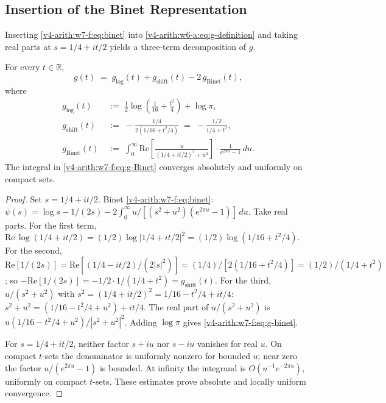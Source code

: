 \subsection{Insertion of the Binet Representation}
\label{v4-arith:w7-f:binet-decomposition:insertion}

Inserting \eqref{v4-arith:w7-f:eq:binet} into
\eqref{v4-arith:w6-a:eq:g-definition} and taking real parts at
\(s=1/4+it/2\) yields a three-term decomposition of \(g\).

\begin{lemma}
\label{v4-arith:w7-f:lem:g-binet}
For every \(t\in\mathbb{R}\),
\begin{equation}
\label{v4-arith:w7-f:eq:g-binet}
g(t)\;=\;g_{\mathrm{log}}(t)+g_{\mathrm{shift}}(t)-2\,g_{\mathrm{Binet}}(t),
\end{equation}
where
\begin{align}
\label{v4-arith:w7-f:eq:g-log}
g_{\mathrm{log}}(t)&\;:=\;\tfrac{1}{2}\log\!\left(\tfrac{1}{16}+\tfrac{t^{2}}{4}\right)+\log\pi,\\
\label{v4-arith:w7-f:eq:g-shift}
g_{\mathrm{shift}}(t)&\;:=\;-\frac{1/4}{2(1/16+t^{2}/4)}\;=\;-\frac{1/2}{1/4+t^{2}},\\
\label{v4-arith:w7-f:eq:g-Binet}
g_{\mathrm{Binet}}(t)&\;:=\;\int_{0}^{\infty}\!\mathrm{Re}\!\left[\frac{u}{(1/4+it/2)^{2}+u^{2}}\right]\cdot\frac{1}{e^{2\pi u}-1}\,du.
\end{align}
The integral in \eqref{v4-arith:w7-f:eq:g-Binet} converges absolutely
and uniformly on compact sets.
\end{lemma}

\begin{proof}
Set \(s=1/4+it/2\). Binet \eqref{v4-arith:w7-f:eq:binet}:
\(\psi(s)=\log s-1/(2s)-2\int_{0}^{\infty}u/[(s^{2}+u^{2})(e^{2\pi u}-1)]\,du\).
Take real parts. For the first term,
\(\mathrm{Re}\,\log(1/4+it/2)=(1/2)\log|1/4+it/2|^{2}=(1/2)\log(1/16+t^{2}/4)\).
For the second,
\(\mathrm{Re}[1/(2s)]=\mathrm{Re}[(1/4-it/2)/(2|s|^{2})]=(1/4)/[2(1/16+t^{2}/4)]=(1/2)/(1/4+t^{2})\);
so \(-\mathrm{Re}[1/(2s)]=-1/2\cdot 1/(1/4+t^{2})=g_{\mathrm{shift}}(t)\).
For the third, \(u/(s^{2}+u^{2})\) with
\(s^{2}=(1/4+it/2)^{2}=1/16-t^{2}/4+it/4\):
\(s^{2}+u^{2}=(1/16-t^{2}/4+u^{2})+it/4\). The real part of
\(u/(s^{2}+u^{2})\) is
\(u(1/16-t^{2}/4+u^{2})/|s^{2}+u^{2}|^{2}\). Adding \(\log\pi\) gives
\eqref{v4-arith:w7-f:eq:g-binet}.

For \(s=1/4+it/2\), neither factor \(s+iu\) nor \(s-iu\)
vanishes for real \(u\). On compact \(t\)-sets the denominator is
uniformly nonzero for bounded \(u\); near zero the factor
\(u/(e^{2\pi u}-1)\) is bounded. At infinity the integrand is
\(O(u^{-1}e^{-2\pi u})\), uniformly on compact \(t\)-sets.
These estimates prove absolute and locally uniform convergence.
\end{proof}

